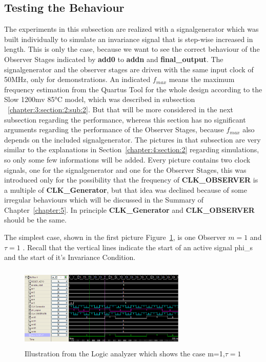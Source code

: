 \subsection{Testing the Behaviour}
\label{chapter:4:section:3:subsection:1}
The experiments in this subsection are realized with a signalgenerator which was built individually to simulate an invariance signal that is step-wise increased in length. 
This is only the case, because we want to see the correct behaviour of the Observer Stages indicated by \textbf{add0} to \textbf{addn} and \textbf{final\_output}. 
The signalgenerator and the observer stages are driven with the same input clock of 50MHz, only for demonstrations. 
An indicated $f_{max}$ means the maximum frequency estimation from the Quartus Tool for the whole design according to the Slow 1200mv 85°C model, 
which was described in subsection ~\ref{chapter:3:section:2:sub:2}. 
But that will be more considered in the next subsection regarding the performance, whereas this section has no significant arguments regarding the performance of the Observer Stages, 
because $f_{max}$ also depends on the included signalgenerator. 
The pictures in that subsection are very similar to the explanations in Section~\ref{chapter:4:section:2} regarding simulations, so only some few informations will be added.
Every picture contains two clock signals, one for the signalgenerator and one for the Observer Stages, 
this was introduced only for the possibility that the frequency of \textbf{CLK\_OBSERVER} is a multiple of \textbf{CLK\_Generator}, 
but that idea was declined because of some irregular behaviours which will be discussed in the Summary of Chapter~\ref{chapter:5}. 
In principle \textbf{CLK\_Generator} and \textbf{CLK\_OBSERVER} should be the same. 


The simplest case, shown in the first picture Figure~\ref{fig:logicanalyzer:m1:t1}, is one Observer $m = 1$ and $\tau = 1$ .
Recall that the vertical lines indicate the start of an active signal phi\_s and the start of it's Invariance Condition.

\begin{figure}[]
\centering
\includegraphics[width=300px,height=150px]{../../pictures/Logicanalyzer/Observer_1_Tau_1.png}
\caption[Logicanalyzer m=1,$\tau=1$]{Illustration from the Logic analyzer which shows the case m=1,$\tau = 1$}
\label{fig:logicanalyzer:m1:t1}
\end{figure}

